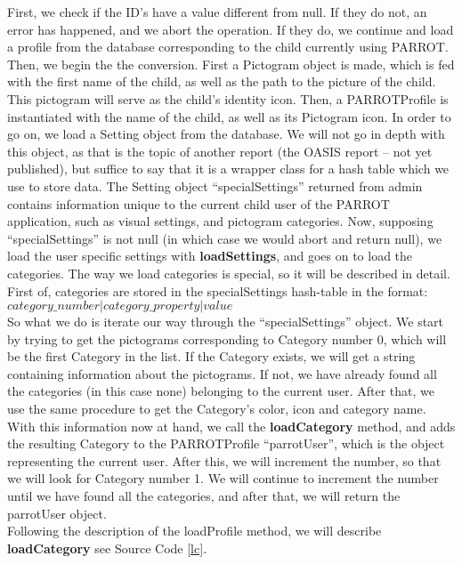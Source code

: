First, we check if the ID's have a value different from null. If they do not, an error has happened, and we abort the operation.
If they do, we continue and load a profile from the database corresponding to the child currently using PARROT.\newline
Then, we begin the the conversion.
First a Pictogram object is made, which is fed with the first name of the child, as well as the path to the picture of the child.
This pictogram will serve as the child's identity icon.
Then, a PARROTProfile is instantiated with the name of the child, as well as its Pictogram icon.\newline
In order to go on, we load a Setting object from the database. We will not go in depth with this object, as that is the topic of another report (the OASIS report -- not yet published), but suffice to say that it is a wrapper class for a hash table %
which we use to store data.\newline
The Setting object ``specialSettings'' returned from admin contains information unique to the current child user of the PARROT application, such as visual settings, and pictogram categories.
Now, supposing ``specialSettings'' is not null (in which case we would abort and return null), we load the user specific settings with \textbf{loadSettings}, and goes on to load the categories.\newline
The way we load categories is special, so it will be described in detail.
First of, categories are stored in the specialSettings hash-table in the format: \newline 
\\
$category\_number | category\_property | value$ \newline
\\
So what we do is iterate our way through the ``specialSettings'' object.
We start by trying to get the pictograms corresponding to Category number 0, which will be the first Category in the list.
If the Category exists, we will get a string containing information about the pictograms.
If not, we have already found all the categories (in this case none) belonging to the current user.\newline
After that, we use the same procedure to get the Category's color, icon and category name.
With this information now at hand, we call the \textbf{loadCategory} method, and adds the resulting Category to the PARROTProfile ``parrotUser'', which is the object representing the current user.\newline
After this, we will increment the number, so that we will look for Category number 1.
We will continue to increment the number until we have found all the categories, and after that, we will return the parrotUser object.\newline
\\
Following the description of the loadProfile method, we will describe \textbf{loadCategory} see Source Code \ref{lc}.

